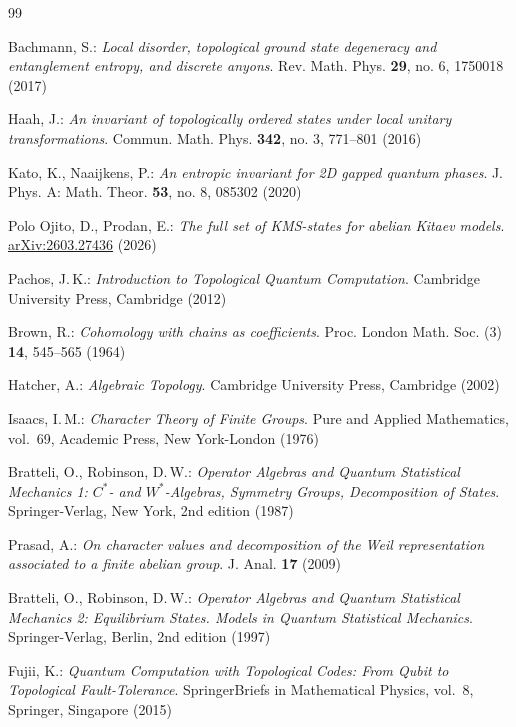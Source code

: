 \documentclass[a4paper,12pt,twoside,reqno]{amsart}
\theoremstyle{plain}
\theoremstyle{definition}
\theoremstyle{remark}
\numberwithin{equation}{section}
\numberwithin{figure}{section}
\numberwithin{table}{section}
\newcommand{\eprint}[1]{\href{https://arxiv.org/abs/#1}{arXiv:#1}}
\begin{document}
\begin{thebibliography}{99}
		
		Bachmann, S.:
		{\sl Local disorder, topological ground state degeneracy and entanglement entropy, and discrete anyons}.
		Rev. Math. Phys. {\bf 29}, no. 6, 1750018 (2017)
		
		Haah, J.:
		{\sl An invariant of topologically ordered states under local unitary transformations}.
		Commun. Math. Phys. {\bf 342}, no. 3, 771--801 (2016)
		
		Kato, K., Naaijkens, P.:
		{\sl An entropic invariant for 2D gapped quantum phases}.
		J. Phys. A: Math. Theor. {\bf 53}, no. 8, 085302 (2020)
		
		Polo Ojito, D., Prodan, E.:
		{\sl The full set of KMS-states for abelian Kitaev models}.
		\eprint{2603.27436} (2026)
		
		Pachos, J.\,K.:
		{\em Introduction to Topological Quantum Computation}.
		Cambridge University Press, Cambridge (2012)
		
		Brown, R.:
		{\sl Cohomology with chains as coefficients}.
		Proc. London Math. Soc. (3) {\bf 14}, 545--565 (1964)
		
		Hatcher, A.:
		{\em Algebraic Topology}.
		Cambridge University Press, Cambridge (2002)
		
		Isaacs, I.\,M.:
		{\em Character Theory of Finite Groups}.
		Pure and Applied Mathematics, vol.~69, Academic Press, New York-London (1976)
		
		Bratteli, O., Robinson, D.\,W.:
		{\em Operator Algebras and Quantum Statistical Mechanics 1: $C^*$- and $W^*$-Algebras, Symmetry Groups, Decomposition of States}.
		Springer-Verlag, New York, 2nd edition (1987)
		
		Prasad, A.:
		{\sl On character values and decomposition of the Weil representation associated to a finite abelian group}.
		J. Anal. {\bf 17} (2009)
		
		Bratteli, O., Robinson, D.\,W.:
		{\em Operator Algebras and Quantum Statistical Mechanics 2: Equilibrium States. Models in Quantum Statistical Mechanics}.
		Springer-Verlag, Berlin, 2nd edition (1997)
		
		Fujii, K.:
		{\em Quantum Computation with Topological Codes: From Qubit to Topological Fault-Tolerance}.
		SpringerBriefs in Mathematical Physics, vol.~8, Springer, Singapore (2015)
		

\end{thebibliography}
\end{document}
